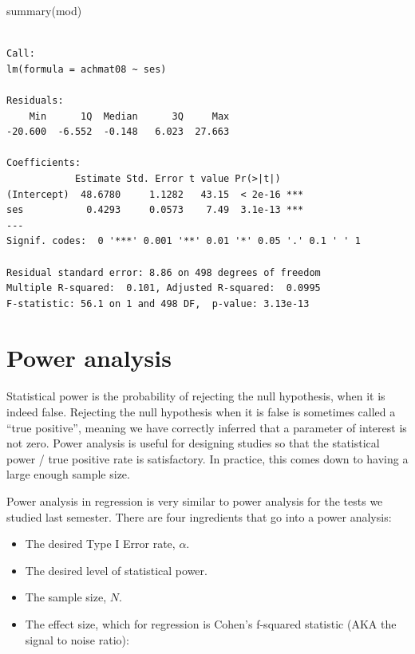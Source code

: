 \documentclass[
  letterpaper,
  DIV=11,
  numbers=noendperiod]{scrreprt}
\newenvironment{Shaded}{\begin{snugshade}}{\end{snugshade}}
\newcommand{\FunctionTok}[1]{\textcolor[rgb]{0.28,0.35,0.67}{#1}}
\newcommand{\NormalTok}[1]{\textcolor[rgb]{0.00,0.23,0.31}{#1}}
\providecommand{\tightlist}{%
  \setlength{\itemsep}{0pt}\setlength{\parskip}{0pt}}\usepackage{longtable,booktabs,array}
\begin{document}
\begin{Shaded}
\begin{Highlighting}[]
\FunctionTok{summary}\NormalTok{(mod)}
\end{Highlighting}
\end{Shaded}

\begin{verbatim}

Call:
lm(formula = achmat08 ~ ses)

Residuals:
    Min      1Q  Median      3Q     Max 
-20.600  -6.552  -0.148   6.023  27.663 

Coefficients:
            Estimate Std. Error t value Pr(>|t|)    
(Intercept)  48.6780     1.1282   43.15  < 2e-16 ***
ses           0.4293     0.0573    7.49  3.1e-13 ***
---
Signif. codes:  0 '***' 0.001 '**' 0.01 '*' 0.05 '.' 0.1 ' ' 1

Residual standard error: 8.86 on 498 degrees of freedom
Multiple R-squared:  0.101, Adjusted R-squared:  0.0995 
F-statistic: 56.1 on 1 and 498 DF,  p-value: 3.13e-13
\end{verbatim}

\hypertarget{power-2}{%
\section{Power analysis}\label{power-2}}

Statistical power is the probability of rejecting the null hypothesis,
when it is indeed false. Rejecting the null hypothesis when it is false
is sometimes called a ``true positive'', meaning we have correctly
inferred that a parameter of interest is not zero. Power analysis is
useful for designing studies so that the statistical power / true
positive rate is satisfactory. In practice, this comes down to having a
large enough sample size.

Power analysis in regression is very similar to power analysis for the
tests we studied last semester. There are four ingredients that go into
a power analysis:

\begin{itemize}
\tightlist
\item
  The desired Type I Error rate, \(\alpha\).
\item
  The desired level of statistical power.
\item
  The sample size, \(N\).
\item
  The effect size, which for regression is Cohen's f-squared statistic
  (AKA the signal to noise ratio):
\end{itemize}
\end{document}
